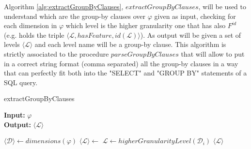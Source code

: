 \documentclass[12pt,a4paper]{report}
\newcommand\globalQuery{\varphi}
\newcommand\feature{F}
\newcommand\idFeature{\feature^{id}}
\newcommand\dimension{\mathcal{D}}
\newcommand\level{\mathcal{L}}
\newcommand\dimensions{dimensions}
\newcommand\id{id}
\newcommand\set[1]{\langle #1 \rangle}
\begin{document}
Algorithm \ref{alg:extractGroupByClauses}, $extractGroupByClauses$, will be used to understand which are the group-by clauses over $\globalQuery$ given as input, checking for each dimension in $\globalQuery$ which level is the higher granularity one that has also $\idFeature$ (e.g. holds the triple $\set{\level,hasFeature,\id(\level)}$).
%
As output will be given a set of levels $\set{\level}$ and each level name will be a group-by clause. 
%
This algorithm is strictly associated to the procedure $parseGroupByClauses$ that will allow to put in a correct string format (comma separated) all the group-by clauses in a way that can perfectly fit both into the "SELECT" and "GROUP BY" statements of a SQL query.
%
\begin{algorithm}[ht]
\caption{extractGroupByClauses}\label{alg:extractGroupByClauses}
\textbf{Input:} $\globalQuery$\\
\textbf{Output:} $\set{\level}$
\begin{algorithmic}[1]
\State $ \set{\dimension} \gets \dimensions(\globalQuery)$
\State $\set{\level} \gets$
\ForEach {$\dimension_{i} \in \set{\dimension}$}
    \State $\level \gets higherGranularityLevel(\dimension_{i})$
\EndFor
\State \Return $\set{\level}$
\end{algorithmic}
\end{algorithm}
\end{document}
